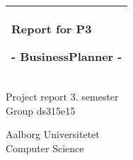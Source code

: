 %
\begin{titlepage}
  \addtolength{\hoffset}{0.5\evensidemargin-0.5\oddsidemargin} %
  \noindent%
  \begin{tabular}{@{}p{\textwidth}@{}}
    \toprule[2pt]
    \midrule
    \vspace{0.2cm}
    \begin{center}
    \Huge{\textbf{
      Report for P3%
    }}
    \end{center}
    \begin{center}
      \Large{
        - BusinessPlanner -%
      }
    \end{center}
    \vspace{0.2cm}\\
    \midrule
    \toprule[2pt]
  \end{tabular}
  \vspace{4 cm}
  \begin{center}
    {\large
      Project report 3. semester%
    }\\
    \vspace{0.2cm}
    {\Large
      Group ds315e15%
    }
  \end{center}
  \vfill
  \begin{center}
  Aalborg Universitetet\\
  Computer Science
  \end{center}
\end{titlepage}
\clearpage
